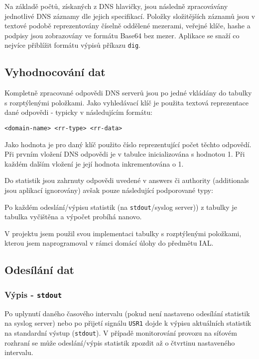 \documentclass[11pt]{article}
\begin{document}
	Na základě počtů, získaných z DNS hlavičky, jsou následně zpracovávány jednotlivé DNS záznamy dle jejich specifikací\cite{RFC1035,RFC4034}.
	Položky složitějších záznamů jsou v textové podobě reprezentovány číselně oddělené mezerami, veřejné klíče, hashe a podpisy jsou zobrazovány ve formátu Base64 bez mezer.
	Aplikace se snaží co nejvíce přiblížit formátu výpisů příkazu \texttt{dig}.
	
	\subsection{Vyhodnocování dat}
	Kompletně zpracované odpovědi DNS serverů jsou po jedné vkládány do tabulky s rozptýlenými položkami.
	Jako vyhledávací klíč je použita textová reprezentace dané odpovědi - typicky v následujícím formátu:
	
	\begin{verbatim}
<domain-name> <rr-type> <rr-data>
	\end{verbatim}
	
	Jako hodnota je pro daný klíč použito číslo reprezentující počet těchto odpovědí.
	Při prvním vložení DNS odpovědi je v tabulce inicializována s hodnotou 1.
	Při každém dalším vložení je její hodnota inkrementována o 1.
	
	Do statistik jsou zahrnuty odpovědi uvedené v answers či authority (additionals jsou aplikací ignorovány) avšak pouze následující podporované typy:
	
	
	Po každém odeslání/výpisu statistik (na \texttt{stdout}/syslog server)) z tabulky je tabulka vyčištěna a výpočet probíhá nanovo.
	
	V projektu jsem použil svou implementaci tabulky s rozptýlenými položkami, kterou jsem naprogramoval v rámci domácí úlohy do předmětu IAL.
	
	
	\subsection{Odesílání dat} \label{section:data-sending}
	\subsubsection{Výpis - \texttt{stdout}}
	Po uplynutí daného časového intervalu (pokud není nastaveno odesílání statistik na syslog server) nebo po přijetí signálu \texttt{USR1} dojde k výpisu aktuálních statistik na standardní výstup (\texttt{stdout}).
	V případě monitorování provozu na síťovém rozhraní se může odeslání/výpis statistik zpozdit až o čtvrtinu nastaveného intervalu.
	
\end{document}
